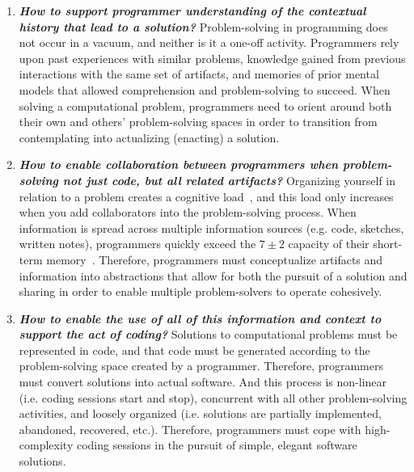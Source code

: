 \documentclass{ppig}
\begin{document}
\begin{enumerate}
  \item \textit{\textbf{How to support programmer understanding of the contextual history that lead to a solution?}}
  Problem-solving in programming does not occur in a vacuum, and neither is it a one-off activity.
  Programmers rely upon past experiences with similar problems, knowledge gained from previous interactions with the same set of artifacts, and memories of prior mental models that allowed comprehension and problem-solving to succeed.
  When solving a computational problem, programmers need to orient around both their own and others' problem-solving spaces in order to transition from contemplating into actualizing (enacting) a solution.
  
  \item \textit{\textbf{How to enable collaboration between programmers when problem-solving not just code, but all related artifacts?}}
  Organizing yourself in relation to a problem creates a cognitive load~\cite{sweller1988cognitive}, and this load only increases when you add collaborators into the problem-solving process.
  When information is spread across multiple information sources (e.g. code, sketches, written notes), programmers quickly exceed the $7\pm2$ capacity of their short-term memory~\cite{lisman1995storage}.
  Therefore, programmers must conceptualize artifacts and information into abstractions that allow for both the pursuit of a solution and sharing in order to enable multiple problem-solvers to operate cohesively.
  
  \item \textit{\textbf{How to enable the use of all of this information and context to support the act of coding?}}
  Solutions to computational problems must be represented in code, and that code must be generated according to the problem-solving space created by a programmer.
  Therefore, programmers must convert solutions into actual software.
  And this process is non-linear (i.e. coding sessions start and stop), concurrent with all other problem-solving activities, and loosely organized (i.e. solutions are partially implemented, abandoned, recovered, etc.).
  Therefore, programmers must cope with high-complexity coding sessions in the pursuit of simple, elegant software solutions.
\end{enumerate}
\end{document}
